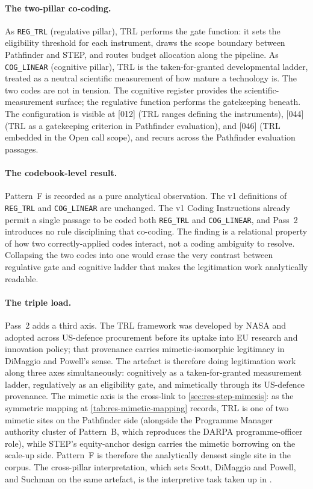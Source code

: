 \paragraph{The two-pillar co-coding.}
As \texttt{REG\_TRL} (regulative pillar), TRL performs the gate
function: it sets the eligibility threshold for each instrument,
draws the scope boundary between Pathfinder and STEP, and routes
budget allocation along the pipeline. As \texttt{COG\_LINEAR}
(cognitive pillar), TRL is the taken-for-granted developmental
ladder, treated as a neutral scientific measurement of how mature a
technology is. The two codes are not in tension. The cognitive
register provides the scientific-measurement surface; the regulative
function performs the gatekeeping beneath. The configuration is
visible at [012] (TRL ranges defining the instruments), [044] (TRL
as a gatekeeping criterion in Pathfinder evaluation), and [046] (TRL
embedded in the Open call scope), and recurs across the Pathfinder
evaluation passages.

\paragraph{The codebook-level result.}
Pattern~F is recorded as a pure analytical observation. The v1
definitions of \texttt{REG\_TRL} and \texttt{COG\_LINEAR} are
unchanged. The v1 Coding Instructions already permit a single
passage to be coded both \texttt{REG\_TRL} and \texttt{COG\_LINEAR},
and Pass~2 introduces no rule disciplining that co-coding. The
finding is a relational property of how two correctly-applied codes
interact, not a coding ambiguity to resolve. Collapsing the two
codes into one would erase the very contrast between regulative gate
and cognitive ladder that makes the legitimation work analytically
readable.

\paragraph{The triple load.}
Pass~2 adds a third axis. The TRL framework was developed by NASA
and adopted across US-defence procurement before its uptake into EU
research and innovation policy; that provenance carries
mimetic-isomorphic legitimacy in DiMaggio and Powell's sense. The
artefact is therefore doing legitimation work along three axes
simultaneously: cognitively as a taken-for-granted measurement
ladder, regulatively as an eligibility gate, and mimetically through
its US-defence provenance. The mimetic axis is the cross-link to
\cref{sec:res-step-mimesis}: as the symmetric mapping at
\cref{tab:res-mimetic-mapping} records, TRL is one of two mimetic
sites on the Pathfinder side (alongside the Programme Manager
authority cluster of Pattern~B, which reproduces the DARPA
programme-officer role), while STEP's equity-anchor design carries
the mimetic borrowing on the scale-up side. Pattern~F is therefore
the analytically densest single site in the corpus. The cross-pillar
interpretation, which sets Scott, DiMaggio and Powell, and Suchman
on the same artefact, is the interpretive task taken up in
.

